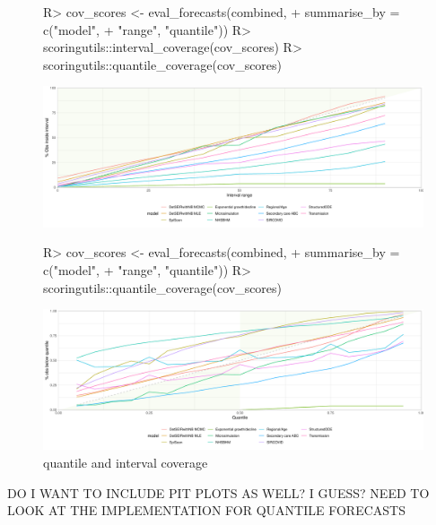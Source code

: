 \documentclass[article]{jss}
\begin{document}
\begin{figure}[h!]
\centering
\begin{Schunk}
\begin{Sinput}
R> cov_scores <- eval_forecasts(combined, 
+                               summarise_by = c("model", 
+                                                "range", "quantile"))
R> scoringutils::interval_coverage(cov_scores)
R> scoringutils::quantile_coverage(cov_scores)
\end{Sinput}
\end{Schunk}
\includegraphics{plots/plot-coverage}

\begin{Schunk}
\begin{Sinput}
R> cov_scores <- eval_forecasts(combined, 
+                               summarise_by = c("model", 
+                                                "range", "quantile"))
R> scoringutils::quantile_coverage(cov_scores)
\end{Sinput}
\end{Schunk}
\includegraphics{plots/plot-quantile-coverage}

\caption{\label{fig:coverage} quantile and interval coverage}
\end{figure}


DO I WANT TO INCLUDE PIT PLOTS AS WELL? I GUESS? NEED TO LOOK AT THE IMPLEMENTATION FOR QUANTILE FORECASTS

% 
\end{document}
